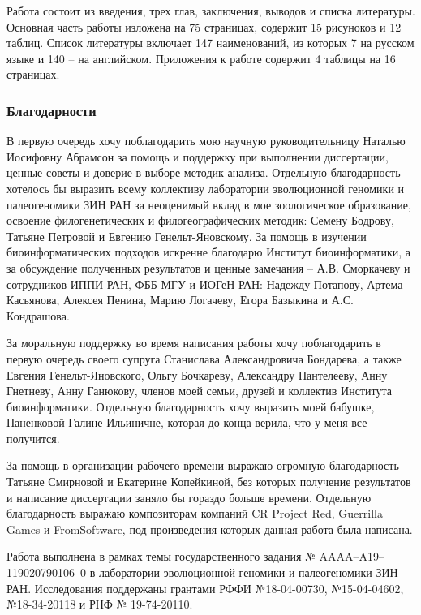 Работа состоит из введения, трех глав, заключения, выводов и списка литературы. Основная часть работы изложена на 75 страницах, содержит 15 рисуноков и 12 таблиц. Список литературы включает 147 наименований, из которых 7 на русском языке и 140 -- на английском. Приложения к работе содержит 4 таблицы на 16 страницах.

\subsubsection*{Благодарности}

В первую очередь хочу поблагодарить мою научную руководительницу Наталью Иосифовну Абрамсон за помощь и поддержку при выполнении диссертации, ценные советы и доверие в выборе методик анализа. Отдельную благодарность хотелось бы выразить всему коллективу лаборатории эволюционной геномики и палеогеномики ЗИН РАН за неоценимый вклад в мое зоологическое образование, освоение филогенетических и филогеографических методик: Семену Бодрову, Татьяне Петровой и Евгению Генельт-Яновскому. За помощь в изучении биоинформатических подходов искренне благодарю Институт биоинформатики, а за обсуждение полученных результатов и ценные замечания -- А.В. Сморкачеву и сотрудников ИППИ РАН, ФББ МГУ и ИОГеН РАН: Надежду Потапову, Артема Касьянова, Алексея Пенина, Марию Логачеву, Егора Базыкина и А.С. Кондрашова.   

За моральную поддержку во время написания работы хочу поблагодарить в первую очередь своего супруга Станислава Александровича Бондарева, а также Евгения Генельт-Яновского, Ольгу Бочкареву, Александру Пантелееву, Анну Гнетневу, Анну Ганюкову, членов моей семьи, друзей и коллектив Института биоинформатики. Отдельную благодарность хочу выразить моей бабушке, Паненковой Галине Ильиничне, которая до конца верила, что у меня все получится. 

За помощь в организации рабочего времени выражаю огромную благодарность Татьяне Смирновой и Екатерине Копейкиной, без которых получение результатов и написание диссертации заняло бы гораздо больше времени. Отдельную благодарность выражаю композиторам компаний CR Project Red, Guerrilla Games и FromSoftware, под произведения которых данная работа была написана. 

Работа выполнена в рамках темы государственного задания № AAAA–A19–119020790106–0 в лаборатории эволюционной геномики и палеогеномики ЗИН РАН. Исследования поддержаны грантами РФФИ №18-04-00730, №15-04-04602, №18-34-20118 и РНФ № 19-74-20110.

\newpage